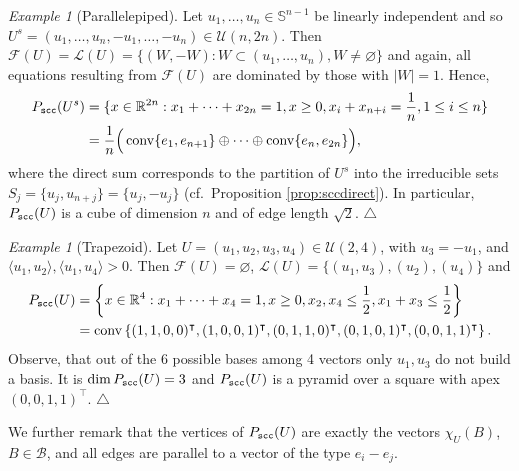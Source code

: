\documentclass[11pt, a4paper, twoside, reqno]{amsart}
\DeclareMathOperator*{\conv}{conv}
\newcommand{\R}{\mathbb{R}}
\theoremstyle{definition}
\theoremstyle{remark}
\newtheorem{example}[theorem]{Example}
\newcommand{\sph}{\mathbb{S}}%
\newcommand{\scc}{{\tt scc}}
\let\emptyset\varnothing
\numberwithin{equation}{section}
\begin{document}
\begin{example}[Parallelepiped] Let $u_1,\dots,u_n\in \sph^{n-1}$ be
  linearly independent and so $U^s=(u_1,\dots,u_{n},-u_1,\dots,-u_{n})\in\mathcal{U}(n,2n)$.
Then $\mathcal{F}(U)=\mathcal{L}(U) =\{(W,-W) : W\subset
(u_1,\dots,u_n), W\ne\emptyset\}$ and again, all equations resulting
from $\mathcal{F}(U)$ are dominated by those with $|W|=1$.
Hence,
  \begin{equation*}
    \begin{split}
     P_\scc(U^s)& =\{x\in\R^{2n}: x_1+\dots +x_{2n}=1, x\geq 0, x_i+x_{n+i}=
     \frac{1}{n}, 1\leq i\leq n \} \\
      &=\frac{1}{n}\Big(          \conv\{e_1,e_{n+1}\} \oplus\dots\oplus  \conv\{e_n,e_{2n}\}\Big) ,
   \end{split}
 \end{equation*}
 where the direct sum corresponds to the partition of $U^s$ into
the  irreducible sets  $S_j= \{u_j,u_{n+j}\}=\{u_j,-u_j\}$ (cf.~Proposition \ref{prop:sccdirect}). In particular, $P_\scc(U)$ is
a cube of dimension $n$ and of edge length $\sqrt{2}$.
\label{ex:parallel} \hfill $\triangle$
\end{example}

 \begin{example}[Trapezoid] Let $U=(u_1,u_2,u_3,u_4)\in \mathcal{U}(2,4)$,
   with  $u_3=-u_1$, and $\langle u_1,u_2\rangle, \langle
   u_1,u_4\rangle >0$. Then  $\mathcal{F}(U)=\emptyset$,
   $\mathcal{L}(U)=\{(u_1,u_3), (u_2), (u_4)\}$  and
   \begin{equation*}
      \begin{split}
     P_\scc(U)& =\left\{x\in\R^{4}: x_1+\dots +x_{4}=1, x\geq 0,
     x_2,x_4\leq\frac{1}{2}, x_1+x_3\leq \frac{1}{2}\right\} \\
      &=\conv\left\{(1,1,0,0)^\intercal, (1,0,0,1)^\intercal, (0,1,1,0) ^\intercal,
      (0,1,0,1) ^\intercal, (0,0,1,1)^\intercal\right\}.
   \end{split}
 \end{equation*}
Observe, that out of the 6 possible bases among 4 vectors only
$u_1,u_3$ do not build a basis. It is $\dim P_\scc(U)=3$ and $P_\scc(U)$ is
a pyramid over a square with apex $(0,0,1,1)^\intercal$. \hfill $\triangle$
\label{ex:trapez}
 \end{example}


We further remark that the vertices of $P_\scc(U)$ are exactly the
vectors $\chi_U(B)$, $B\in\mathcal{B}$, and all
edges are parallel to a vector of the type $e_i-e_j$. \cite{FeichtnerSturmfels2005}
\end{document}
